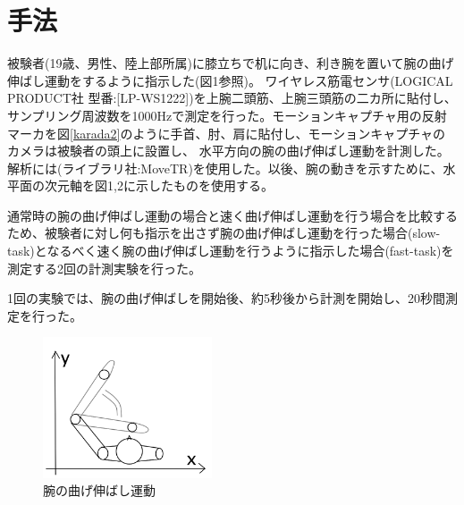 \documentclass{jsarticle}
\begin{document}

\section{手法}
被験者(19歳、男性、陸上部所属)に膝立ちで机に向き、利き腕を置いて腕の曲げ伸ばし運動をするように指示した(図1参照)。
ワイヤレス筋電センサ(LOGICAL PRODUCT社 型番:[LP-WS1222])を上腕二頭筋、上腕三頭筋の二カ所に貼付し、サンプリング周波数を1000Hzで測定を行った。モーションキャプチャ用の反射マーカを図\ref{karada2}のように手首、肘、肩に貼付し、モーションキャプチャのカメラは被験者の頭上に設置し、
水平方向の腕の曲げ伸ばし運動を計測した。解析には(ライブラリ社:MoveTR)を使用した。以後、腕の動きを示すために、水平面の次元軸を図1,2に示したものを使用する。

通常時の腕の曲げ伸ばし運動の場合と速く曲げ伸ばし運動を行う場合を比較するため、被験者に対し何も指示を出さず腕の曲げ伸ばし運動を行った場合(slow-task)となるべく速く腕の曲げ伸ばし運動を行うように指示した場合(fast-task)を測定する2回の計測実験を行った。

1回の実験では、腕の曲げ伸ばしを開始後、約5秒後から計測を開始し、20秒間測定を行った。

\begin{figure}[htb]
  \begin{center}
    \includegraphics[width=5cm]{karada1.png}
    \caption{腕の曲げ伸ばし運動}
    \label{karada1}
  \end{center}
\end{figure}

\end{document}
